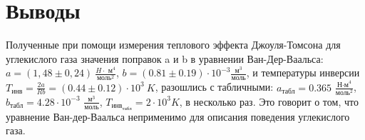 \chapter{Выводы}
\label{ch:conclusions}

Полученные при помощи измерения теплового эффекта Джоуля-Томсона для углекислого газа значения поправок a и b в уравнении Ван-Дер-Ваальса:  
$a  = (1,48 \pm 0,24) \  \frac{H\cdot\text{ м} ^4}{\text{моль} ^2}$, $b = (0.81 \pm 0.19) \cdot 10^{-3} \frac{\text{м} ^3}{\text{моль}}$, и температуры инверсии $T_{\text{инв}} = \frac{2a}{Rb} = (0.44 \pm 0.12) \cdot 10^3 \ K$, разошлись с табличными: $a_{\text{табл}} = 0.365$ $\frac{\text{Н·м}^4}{\text{моль}^2}$, $b_{\text{табл}} = 4.28 \cdot 10^{-3}$ $\frac{\text{м}^3}{\text{моль}}$, $T_{{{\text{инв}}}_{\text{табл}}} = 2 \cdot 10^{3} K$, в несколько раз. Это говорит о том, что уравнение Ван-дер-Ваальса неприменимо для описания поведения углекислого газа.




